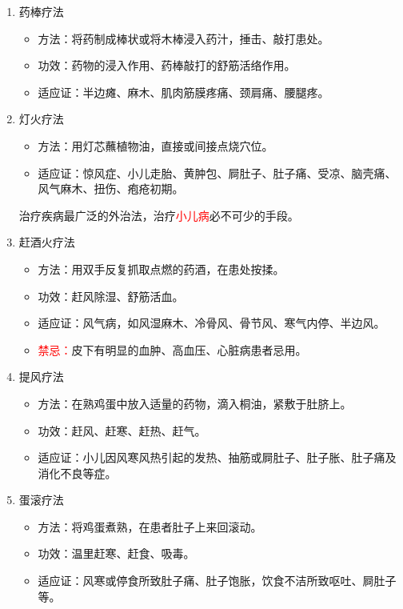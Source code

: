 \documentclass[cn,blue,12pt,normal,founder]{elegantnote}
\newcommand{\redt}[1]{\textcolor{red}{{}#1}}      %
\begin{document}
\begin{enumerate}
  \item 药棒疗法
  \begin{itemize}
    \item 方法：将药制成棒状或将木棒浸入药汁，捶击、敲打患处。
    \item 功效：药物的浸入作用、药棒敲打的舒筋活络作用。
    \item 适应证：半边瘫、麻木、肌肉筋膜疼痛、颈肩痛、腰腿疼。
  \end{itemize}
  \item 灯火疗法
  \begin{itemize}
    \item 方法：用灯芯蘸植物油，直接或间接点烧穴位。
    \item 适应证：惊风症、小儿走胎、黄肿包、屙肚子、肚子痛、受凉、脑壳痛、风气麻木、扭伤、疱疮初期。
  \end{itemize}
  \begin{note}
  治疗疾病最广泛的外治法，治疗\redt{小儿病}必不可少的手段。
  \end{note}
  \item 赶酒火疗法
  \begin{itemize}
    \item 方法：用双手反复抓取点燃的药酒，在患处按揉。
    \item 功效：赶风除湿、舒筋活血。
    \item 适应证：风气病，如风湿麻木、冷骨风、骨节风、寒气内停、半边风。
    \item \redt{禁忌：}皮下有明显的血肿、高血压、心脏病患者忌用。
  \end{itemize}
  \item 提风疗法
  \begin{itemize}
    \item 方法：在熟鸡蛋中放入适量的药物，滴入桐油，紧敷于肚脐上。
    \item 功效：赶风、赶寒、赶热、赶气。
    \item 适应证：小儿因风寒风热引起的发热、抽筋或屙肚子、肚子胀、肚子痛及消化不良等症。
  \end{itemize}
  \item 蛋滚疗法
  \begin{itemize}
    \item 方法：将鸡蛋煮熟，在患者肚子上来回滚动。
    \item 功效：温里赶寒、赶食、吸毒。
    \item 适应证：风寒或停食所致肚子痛、肚子饱胀，饮食不洁所致呕吐、屙肚子等。

\end{itemize}
\end{enumerate}
\end{document}

